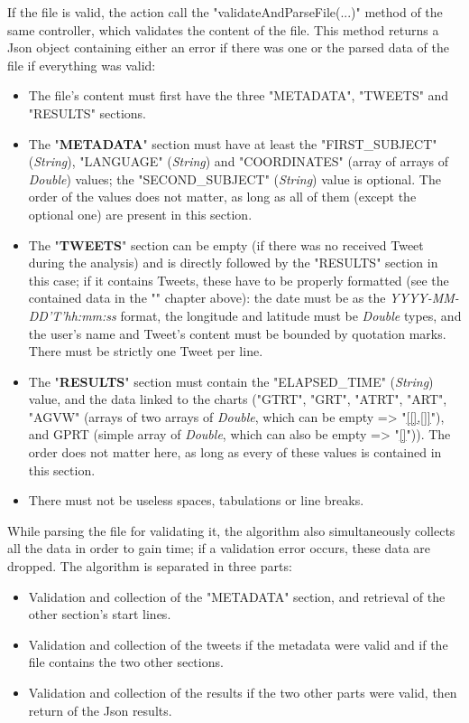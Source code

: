 \documentclass[a4paper,11pt]{report}
\begin{document}
If the file is valid, the action call the "validateAndParseFile(...)" method of the same controller, which validates the content of the file. This method returns a Json object containing either an error if there was one or the parsed data of the file if everything was valid: 
\begin{itemize}
	\item The file's content must first have the three "METADATA", "TWEETS" and "RESULTS" sections.
	\item The "\textbf{METADATA}" section must have at least the "FIRST\_SUBJECT" (\emph{String}), "LANGUAGE" (\emph{String}) and "COORDINATES" (array of arrays of \emph{Double}) values; the "SECOND\_SUBJECT" (\emph{String}) value is optional. The order of the values does not matter, as long as all of them (except the optional one) are present in this section.
	\item The "\textbf{TWEETS}" section can be empty (if there was no received Tweet during the analysis) and is directly followed by the "RESULTS" section in this case; if it contains Tweets, these have to be properly formatted (see the contained data in the "" chapter above): the date must be as the \emph{YYYY-MM-DD'T'hh:mm:ss} format, the longitude and latitude must be \emph{Double} types, and the user's name and Tweet's content must be bounded by quotation marks. There must be strictly one Tweet per line.
	\item The "\textbf{RESULTS}" section must contain the "ELAPSED\_TIME" (\emph{String}) value, and the data linked to the charts ("GTRT", "GRT", "ATRT", "ART", "AGVW" (arrays of two arrays of \emph{Double}, which can be empty => "\underline{[[],[]]}"), and GPRT (simple array of \emph{Double}, which can also be empty => "\underline{[]}")). The order does not matter here, as long as every of these values is contained in this section.
	\item There must not be useless spaces, tabulations or line breaks.
\end{itemize}

While parsing the file for validating it, the algorithm also simultaneously collects all the data in order to gain time; if a validation error occurs, these data are dropped. The algorithm is separated in three parts: 
\begin{itemize}
	\item Validation and collection of the "METADATA" section, and retrieval of the other section's start lines.
	\item Validation and collection of the tweets if the metadata were valid and if the file contains the two other sections.
	\item Validation and collection of the results if the two other parts were valid, then return of the Json results.
\end{itemize}
\end{document}
